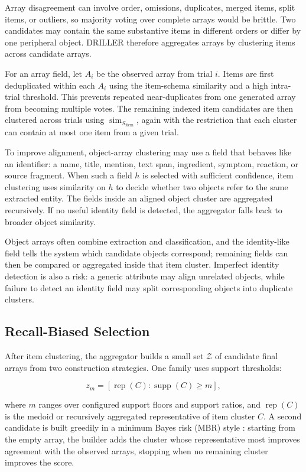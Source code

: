 Array disagreement can involve order, omissions, duplicates, merged items, split items, or outliers, so majority voting over complete arrays would be brittle. Two candidates may contain the same substantive items in different orders or differ by one peripheral object. DRILLER therefore aggregates arrays by clustering items across candidate arrays.

For an array field, let \(A_i\) be the observed array from trial \(i\). Items are first deduplicated within each \(A_i\) using the item-schema similarity and a high intra-trial threshold. This prevents repeated near-duplicates from one generated array from becoming multiple votes. The remaining indexed item candidates are then clustered across trials using \(\operatorname{sim}_{S_{\mathrm{item}}}\), again with the restriction that each cluster can contain at most one item from a given trial.

To improve alignment, object-array clustering may use a field that behaves like an identifier: a name, title, mention, text span, ingredient, symptom, reaction, or source fragment. When such a field \(h\) is selected with sufficient confidence, item clustering uses similarity on \(h\) to decide whether two objects refer to the same extracted entity. The fields inside an aligned object cluster are aggregated recursively. If no useful identity field is detected, the aggregator falls back to broader object similarity.

Object arrays often combine extraction and classification, and the identity-like field tells the system which candidate objects correspond; remaining fields can then be compared or aggregated inside that item cluster. Imperfect identity detection is also a risk: a generic attribute may align unrelated objects, while failure to detect an identity field may split corresponding objects into duplicate clusters.

\subsection{Recall-Biased Selection}

After item clustering, the aggregator builds a small set \(\mathcal{Z}\) of candidate final arrays from two construction strategies. One family uses support thresholds:

\[
z_m=\left[\operatorname{rep}(C): \operatorname{supp}(C)\geq m\right],
\]

where \(m\) ranges over configured support floors and support ratios, and \(\operatorname{rep}(C)\) is the medoid or recursively aggregated representative of item cluster \(C\). A second candidate is built greedily in a minimum Bayes risk (MBR) style \cite{kumar-byrne-2004-minimum}: starting from the empty array, the builder adds the cluster whose representative most improves agreement with the observed arrays, stopping when no remaining cluster improves the score.

